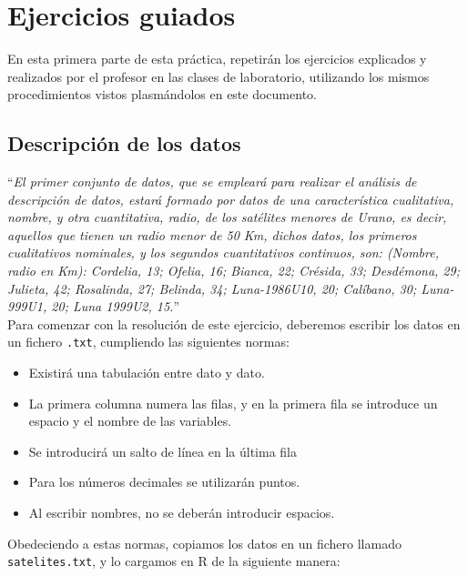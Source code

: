 \documentclass[12pt]{report}\usepackage[]{graphicx}\usepackage[dvipsnames]{xcolor}
\begin{document}
	\chapter{Ejercicios guiados}\pagestyle{fancy}
	
		En esta primera parte de esta práctica, repetirán los ejercicios explicados y realizados por el profesor en las clases de laboratorio, utilizando los mismos procedimientos vistos plasmándolos en este documento. 
	
		\section{Descripción de los datos}
		
			``\textit{El primer conjunto de datos, que se empleará para realizar el análisis de descripción de datos, estará formado por datos de una característica cualitativa, nombre, y otra cuantitativa, radio, de los satélites menores de Urano, es decir, aquellos que tienen un radio menor de 50 Km, dichos datos, los primeros cualitativos nominales, y los segundos cuantitativos continuos, son: (Nombre, radio en Km): Cordelia, 13; Ofelia, 16; Bianca, 22; Crésida, 33; Desdémona, 29; Julieta, 42; Rosalinda, 27; Belinda, 34; Luna-1986U10, 20; Calíbano, 30; Luna-999U1, 20; Luna 1999U2, 15.}''\\
			
			Para comenzar con la resolución de este ejercicio, deberemos escribir los datos en un fichero \texttt{.txt}, cumpliendo las siguientes normas: 
			
			\begin{itemize}
				\item Existirá una tabulación entre dato y dato. 
				\item La primera columna numera las filas, y en la primera fila se introduce un espacio y el nombre de las variables. 
				\item Se introducirá un salto de línea en la última fila
				\item Para los números decimales se utilizarán puntos. 
				\item Al escribir nombres, no se deberán introducir espacios. 
			\end{itemize}
			
			Obedeciendo a estas normas, copiamos los datos en un fichero llamado \texttt{satelites.txt}, y lo cargamos en R de la siguiente manera: 
			
\end{document}

